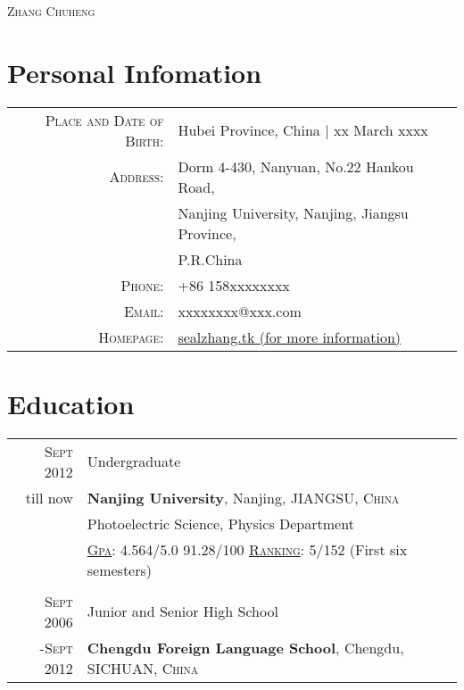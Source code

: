 \documentclass[ENG]{Sketch}
\begin{document}
\par{\centering
		{%
		\Huge \textsc{Zhang Chuheng} }
		\bigskip\par}



\section{Personal Infomation}

\begin{tabular}{rl}
    \textsc{Place and Date of Birth:} & Hubei Province, China  | xx March xxxx \\
    \textsc{Address:}   & Dorm 4-430, Nanyuan, No.22 Hankou Road, \\
                        & Nanjing University, Nanjing, Jiangsu Province, \\
                        & P.R.China \\
    \textsc{Phone:}     & +86 158xxxxxxxx\\
    \textsc{Email:}     & xxxxxxxx@xxx.com \\
    \textsc{Homepage:}  & \href{http://sealzhang.tk}{sealzhang.tk (for more information)} 
\end{tabular}

\section{Education}
\begin{tabular}{rl}	
\textsc{Sept} 2012 & Undergraduate\\
till now & \textbf{Nanjing University}, Nanjing, JIANGSU, \textsc{China}\\
& Photoelectric Science, Physics Department \\
&\normalsize \textsc{\underline{Gpa}}: 4.564/5.0 91.28/100 \textsc{\underline{Ranking}}: 5/152 (First six semesters)\\
\\
\textsc{Sept} 2006 & Junior and Senior High School\\
-\textsc{Sept} 2012 & \textbf{Chengdu Foreign Language School}, Chengdu, SICHUAN, \textsc{China}\\

\end{tabular}

\end{document}
